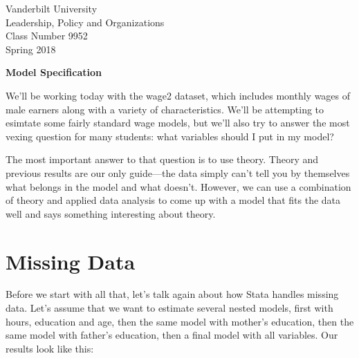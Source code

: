 \documentclass[12pt]{article}
\begin{document}
\thispagestyle{empty}%


\setlength{\parskip}{1ex plus 0.5ex minus 0.2ex}

\setcounter{secnumdepth}{-2}



\begin{flushleft}
Vanderbilt University\\Leadership, Policy and Organizations\\Class Number 9952\\ Spring 2018
\end{flushleft}

\begin{center}
\textbf{Model Specification}
\end{center}

We'll be working today with the wage2 dataset, which includes monthly
wages of male earners along with a variety of characteristics. We'll
be attempting to esimtate some fairly standard wage models, but we'll
also try to answer the most vexing question for many students: what
variables should I put in my model?

The most important answer to that question is to use theory. Theory
and previous results are our only guide---the data simply can't tell
you by themselves what belongs in the model and what doesn't. However,
we can  use a combination of theory and applied data analysis to come
up with a model that fits the data well and says something interesting
about theory. 

\section{Missing Data}
\label{sec:missing-data}

Before we start with all that, let's talk again about how Stata
handles missing data. Let's assume that we want to estimate several
nested models, first with hours, education and age, then the same
model with mother's education, then the same model with father's
education, then a final model with all variables. Our results look
like this: 
\end{document}
